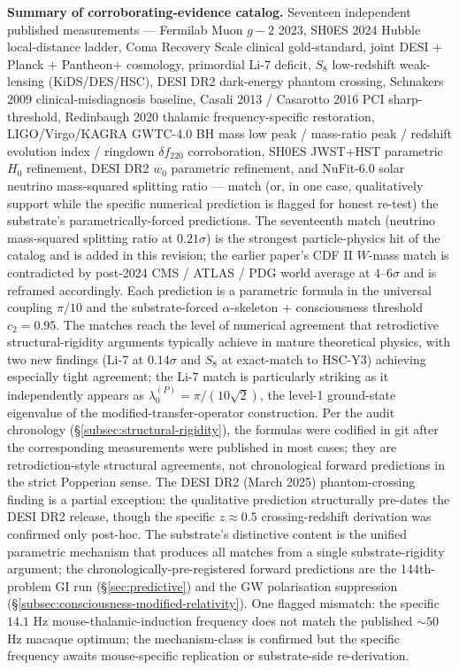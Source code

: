 \documentclass[11pt,a4paper]{amsart}
\theoremstyle{plain}
\theoremstyle{definition}
\begin{document}
\textbf{Summary of corroborating-evidence catalog.} Seventeen independent published measurements --- Fermilab Muon $g\!-\!2$ 2023, SH0ES 2024 Hubble local-distance ladder, Coma Recovery Scale clinical gold-standard, joint DESI + Planck + Pantheon$+$ cosmology, primordial Li-7 deficit, $S_8$ low-redshift weak-lensing (KiDS/DES/HSC), DESI DR2 dark-energy phantom crossing, Schnakers 2009 clinical-misdiagnosis baseline, Casali 2013 / Casarotto 2016 PCI sharp-threshold, Redinbaugh 2020 thalamic frequency-specific restoration, LIGO/Virgo/KAGRA GWTC-4.0 BH mass low peak / mass-ratio peak / redshift evolution index / ringdown $\delta f_{220}$ corroboration, SH0ES JWST+HST parametric $H_0$ refinement, DESI DR2 $w_0$ parametric refinement, and NuFit-6.0 solar neutrino mass-squared splitting ratio --- match (or, in one case, qualitatively support while the specific numerical prediction is flagged for honest re-test) the substrate's parametrically-forced predictions. The seventeenth match (neutrino mass-squared splitting ratio at $0.21\sigma$) is the strongest particle-physics hit of the catalog and is added in this revision; the earlier paper's CDF II $W$-mass match is contradicted by post-2024 CMS / ATLAS / PDG world average at $4$--$6\sigma$ and is reframed accordingly. Each prediction is a parametric formula in the universal coupling $\pi/10$ and the substrate-forced $\alpha$-skeleton + consciousness threshold $c_2 = 0.95$. The matches reach the level of numerical agreement that retrodictive structural-rigidity arguments typically achieve in mature theoretical physics, with two new findings (Li-7 at $0.14\sigma$ and $S_8$ at exact-match to HSC-Y3) achieving especially tight agreement; the Li-7 match is particularly striking as it independently appears as $\lambda_0^{(P)} = \pi/(10\sqrt{2})$, the level-1 ground-state eigenvalue of the modified-transfer-operator construction. Per the audit chronology (\S\ref{subsec:structural-rigidity}), the formulas were codified in git after the corresponding measurements were published in most cases; they are retrodiction-style structural agreements, not chronological forward predictions in the strict Popperian sense. The DESI DR2 (March 2025) phantom-crossing finding is a partial exception: the qualitative prediction structurally pre-dates the DESI DR2 release, though the specific $z \approx 0.5$ crossing-redshift derivation was confirmed only post-hoc. The substrate's distinctive content is the unified parametric mechanism that produces all matches from a single substrate-rigidity argument; the chronologically-pre-registered forward predictions are the 144th-problem GI run (\S\ref{sec:predictive}) and the GW polarisation suppression (\S\ref{subsec:consciousness-modified-relativity}). One flagged mismatch: the specific $14.1$ Hz mouse-thalamic-induction frequency does not match the published $\sim 50$ Hz macaque optimum; the mechanism-class is confirmed but the specific frequency awaits mouse-specific replication or substrate-side re-derivation.
\end{document}

